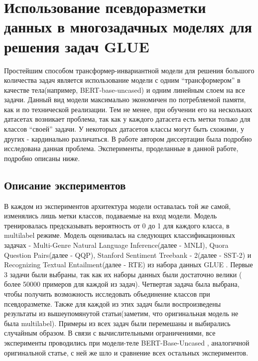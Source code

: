 \chapter{Использование псевдоразметки данных в многозадачных моделях для решения задач GLUE}\label{ch:ch3}

Простейшим способом трансформер-инвариантной модели для решения большого количества задач является использование модели с одним “трансформером” в качестве тела(например, BERT-base-uncased) и одним линейным слоем на все задачи. Данный вид модели максимально экономичен по потребляемой памяти, как и по технической реализации. Тем не менее, при обучении его на нескольких датасетах возникает проблема, так как у каждого датасета есть метки только для классов “своей” задачи. У некоторых датасетов классы могут быть схожими, у других - кардинально различаться. В работе \cite{Karpov_Burtsev_2021} автором диссертации была подробно исследована данная проблема. Эксперименты, проделанные в данной работе, подробно описаны ниже.




\section{Описание экспериментов}\label{sec:ch3/sect1}
В каждом из экспериментов архитектура модели оставалась той же самой, изменялись лишь метки классов, подаваемые на вход модели. Модель тренировалась предсказывать вероятность от 0 до 1 для каждого класса, в multilabel режиме.
Модель оценивалась на следующих классификационных задачах - Multi-Genre Natural Language Inference(далее - MNLI), Quora Question Pairs(далее - QQP), Stanford Sentiment Treebank - 2(далее - SST-2) и Recognizing Textual Entailment(далее - RTE) из набора данных GLUE \cite{wang_2018}. Первые 3 задачи были выбраны, так как их наборы данных были достаточно велики ( более 50000 примеров для каждой из задач). Четвертая задача была выбрана, чтобы получить возможность исследовать объединение классов при псевдоразметке. Также для каждой из этих задач были воспроизведены результаты из вышеупомянутой статьи(заметим, что оригинальная модель не была multilabel). Примеры из всех задач были перемешаны и выбирались случайным образом. В связи с вычислительными ограничениями, все эксперименты проводились при модели-теле BERT-Base-Uncased \cite{devlin_2018}, аналогичной оригинальной статье, с ней же шло и сравнение всех остальных экспериментов.


